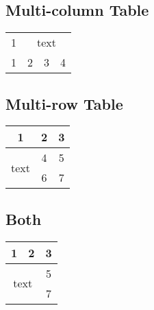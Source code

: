 \documentclass[14pt, a4paper]{article} %
\begin{document}
\subsection{Multi-column Table}

\begin{tabular}{|c|ccc|}
	\hline
	1 & \multicolumn{3}{c|}{text} \\ 
	\cline{2-4}
	1 & 2 & 3 & 4  \\
	\hline

\end{tabular}


\subsection{Multi-row Table}

\begin{tabular}{|c|c|c|}
	\hline
	1 & 2 & 3 \\ 
	\hline
	\multirow{2}{*}{text} & 4 & 5 \\
	& 6 & 7 \\ 
	\hline


\end{tabular}

\subsection{Both}

\begin{tabular}{|cc|c|}
	\hline
	1 & 2 & 3 \\ 
	\hline
	\multicolumn{2}{|c|}{\multirow{2}{*}{text}} & 5 \\
	& & 7 \\
	\hline
\end{tabular}
\end{document}
